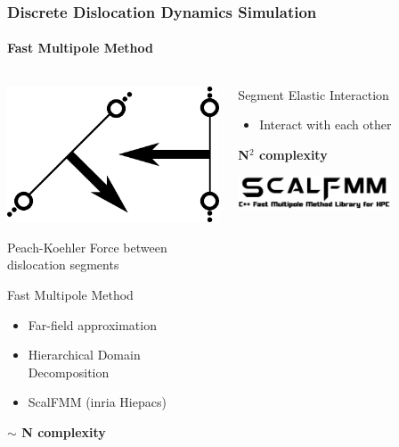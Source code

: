 \documentclass[aspectratio=1610,t,10pt]{beamer}
\newlength{\freeheight}
\begin{document}
\begin{frame}
    \frametitle{Discrete Dislocation Dynamics Simulation}
    \framesubtitle{Fast Multipole Method}
    \begin{columns}[c]
    \begin{column}{.48\textwidth}
        \centering
        
        \vspace{1em}
        
        \includegraphics[height=0.3\freeheight, keepaspectratio]{img/elastic_force.pdf}
        
        {\small Peach-Koehler Force between dislocation segments}
        
        \vspace{1em}
        
        \begin{block}{Fast Multipole Method}
            \begin{itemize}
                \item Far-field approximation
                \item Hierarchical Domain Decomposition
                \item ScalFMM (inria Hiepacs)
            \end{itemize}
            \textbf{ $\sim$ N complexity}
        \end{block}
    \end{column}
    \begin{column}{.48\textwidth}
        \begin{block}{Segment Elastic Interaction}
            \begin{itemize}
                \item Interact with each other
            \end{itemize}
            \textbf{ N$^2$ complexity}
        \end{block}
        \vspace{2em}
        \centering
        \includegraphics[width=0.7\textwidth, keepaspectratio]{img/scalfmm}   
             

\end{column}
\end{columns}
\end{frame}
\end{document}
